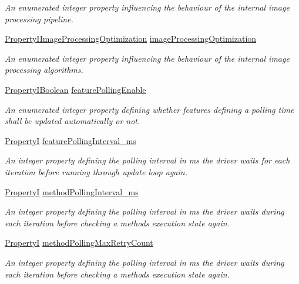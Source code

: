 \begin{DoxyCompactItemize}
\begin{DoxyCompactList}\small\item\em An enumerated integer property influencing the behaviour of the internal image processing pipeline. \end{DoxyCompactList}\item 
\hyperlink{group___common_interface_gad70153dd4d03d0db8f97382da8ae2d05}{Property\+I\+Image\+Processing\+Optimization} \hyperlink{classmv_i_m_p_a_c_t_1_1acquire_1_1_system_settings_afa429bb0a75e996fba2493c320003d7f}{image\+Processing\+Optimization}
\begin{DoxyCompactList}\small\item\em An enumerated integer property influencing the behaviour of the internal image processing algorithms. \end{DoxyCompactList}\item 
\hyperlink{group___common_interface_ga44f9437e24b21b6c93da9039ec6786aa}{Property\+I\+Boolean} \hyperlink{classmv_i_m_p_a_c_t_1_1acquire_1_1_system_settings_a527250faf209d3f965146a88ea3a4369}{feature\+Polling\+Enable}
\begin{DoxyCompactList}\small\item\em An enumerated integer property defining whether features defining a polling time shall be updated automatically or not. \end{DoxyCompactList}\item 
\hyperlink{group___common_interface_ga12d5e434238ca242a1ba4c6c3ea45780}{Property\+I} \hyperlink{classmv_i_m_p_a_c_t_1_1acquire_1_1_system_settings_a0dcec7c243f9dc081e51da6842e3a0a4}{feature\+Polling\+Interval\+\_\+ms}
\begin{DoxyCompactList}\small\item\em An integer property defining the polling interval in ms the driver waits for each iteration before running through update loop again. \end{DoxyCompactList}\item 
\hyperlink{group___common_interface_ga12d5e434238ca242a1ba4c6c3ea45780}{Property\+I} \hyperlink{classmv_i_m_p_a_c_t_1_1acquire_1_1_system_settings_ac2f583cba036d74278d8093d4f529c4a}{method\+Polling\+Interval\+\_\+ms}
\begin{DoxyCompactList}\small\item\em An integer property defining the polling interval in ms the driver waits during each iteration before checking a methods execution state again. \end{DoxyCompactList}\item 
\hyperlink{group___common_interface_ga12d5e434238ca242a1ba4c6c3ea45780}{Property\+I} \hyperlink{classmv_i_m_p_a_c_t_1_1acquire_1_1_system_settings_a130e46bcd1eaf610f17c9049534b04e0}{method\+Polling\+Max\+Retry\+Count}
\begin{DoxyCompactList}\small\item\em An integer property defining the polling interval in ms the driver waits during each iteration before checking a methods execution state again. \end{DoxyCompactList}\end{DoxyCompactItemize}
